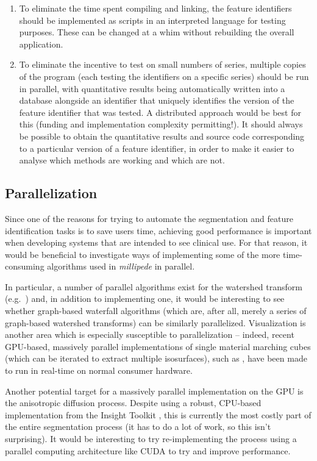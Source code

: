 \begin{itemize}
\begin{enumerate}
\item To eliminate the time spent compiling and linking, the feature identifiers should be implemented as scripts in an interpreted language for testing purposes. These can be changed at a whim without rebuilding the overall application.

\item To eliminate the incentive to test on small numbers of series, multiple copies of the program (each testing the identifiers on a specific series) should be run in parallel, with quantitative results being automatically written into a database alongside an identifier that uniquely identifies the version of the feature identifier that was tested. A distributed approach would be best for this (funding and implementation complexity permitting!). It should always be possible to obtain the quantitative results and source code corresponding to a particular version of a feature identifier, in order to make it easier to analyse which methods are working and which are not.

\end{enumerate}

\end{itemize}

\subsection{Parallelization}

Since one of the reasons for trying to automate the segmentation and feature identification tasks is to save users time, achieving good performance is important when developing systems that are intended to see clinical use. For that reason, it would be beneficial to investigate ways of implementing some of the more time-consuming algorithms used in \emph{millipede} in parallel.

In particular, a number of parallel algorithms exist for the watershed transform (e.g.~\cite{bieniek97,moga98}) and, in addition to implementing one, it would be interesting to see whether graph-based waterfall algorithms (which are, after all, merely a series of graph-based watershed transforms) can be similarly parallelized. Visualization is another area which is especially susceptible to parallelization -- indeed, recent GPU-based, massively parallel implementations of single material marching cubes (which can be iterated to extract multiple isosurfaces), such as \cite{dyken08}, have been made to run in real-time on normal consumer hardware.

Another potential target for a massively parallel implementation on the GPU is the anisotropic diffusion process. Despite using a robust, CPU-based implementation from the Insight Toolkit \cite{itk}, this is currently the most costly part of the entire segmentation process (it has to do a lot of work, so this isn't surprising). It would be interesting to try re-implementing the process using a parallel computing architecture like CUDA \cite{cuda} to try and improve performance.
